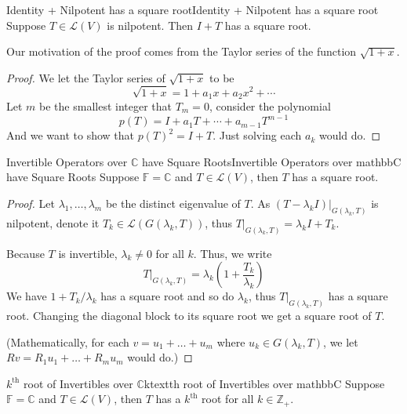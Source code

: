 \documentclass[../main.tex]{subfiles}
\begin{document}
\begin{proposition}{Identity + Nilpotent has a square root}{Identity + Nilpotent has a square root}
Suppose $T\in \mathscr{L}(V)$ is nilpotent. Then $I+T$ has a square root.
\end{proposition}
Our motivation of the proof comes from the Taylor series of the function $\sqrt{1+x}$.
\begin{proof}
We let the Taylor series of $\sqrt{1+x}$ to be
\begin{equation*}
\sqrt{1+x} = 1+a_1x+a_2x^2+\cdots 
\end{equation*}
Let $m$ be the smallest integer that $T_m=0$, consider the polynomial
\begin{equation*}
p(T) = I + a_1T + \cdots + a _{m-1}T^{m-1}
\end{equation*}
And we want to show that $p(T)^2=I+T$. Just solving each $a_k$ would do.
\end{proof}

\begin{theorem}{Invertible Operators over $\mathbb{C}$ have Square Roots}{Invertible Operators over mathbbC have Square Roots}
Suppose $\mathbb{F}=\mathbb{C}$ and $T\in \mathscr{L}(V)$, then $T$ has a square root.
\end{theorem}
\begin{proof}
Let $\lambda_1, \ldots ,\lambda_m$ be the distinct eigenvalue of $T$. As $(T-\lambda_kI)|_{G(\lambda_k,T)}$ is nilpotent, denote it $T_k\in \mathscr{L}(G(\lambda_k,T))$, thus $T|_{G(\lambda_k,T)} = \lambda_kI+T_k$.

Because $T$ is invertible, $\lambda_k \neq 0$ for all $k$. Thus, we write
\begin{equation*}
T|_{G(\lambda_k,T)}= \lambda_k \left(1 + \frac{T_k}{\lambda_k}\right)
\end{equation*}
We have $1 + T_k / \lambda_k$ has a square root and so do $\lambda_k$, thus $T|_{G(\lambda_k,T)}$ has a square root. Changing the diagonal block to its square root we get a square root of $T$.

(Mathematically, for each $v = u_1+\ldots +u_m$ where $u_k\in G(\lambda_k,T)$, we let $Rv = R_1u_1+\ldots +R_mu_m$ would do.)
\end{proof}

\begin{corollary}{$k^\text{th}$ root of Invertibles over $\mathbb{C}$}{ktextth root of Invertibles over mathbbC}
Suppose $\mathbb{F}=\mathbb{C}$ and $T\in \mathscr{L}(V)$, then $T$ has a $k^\text{th}$ root for all $k\in \mathbb{Z}_+$.
\end{corollary}
\end{document}
